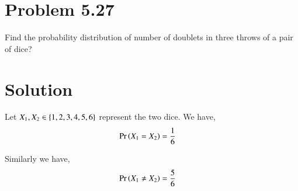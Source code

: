 \documentclass[journal,12pt,twocolumn]{IEEEtran}
\begin{document}
\section*{Problem 5.27}
Find the probability distribution of number of doublets in three throws of a pair of dice?
\section*{Solution}
Let $X_1, X_2 \in \left\{1, 2, 3, 4, 5, 6 \right\} $ represent the two dice.
We have,
\begin{align}
    \Pr\left(X_1 =X_2\right) &= \frac{1}{6}
\end{align}

Similarly we have, 
\begin{align}
    \Pr\left(X_1 \neq X_2\right) &= \frac{5}{6}
\end{align}
\end{document}
